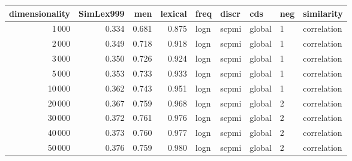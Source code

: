 \begin{tabular}{rrrrlllll}
\toprule
 dimensionality &  SimLex999 &    men &  lexical &  freq &  discr &     cds & neg &   similarity \\
\midrule
           1\,000 &      0.334 &  0.681 &    0.875 &  logn &  scpmi &  global &   1 &  correlation \\
           2\,000 &      0.349 &  0.718 &    0.918 &  logn &  scpmi &  global &   1 &  correlation \\
           3\,000 &      0.350 &  0.726 &    0.924 &  logn &  scpmi &  global &   1 &  correlation \\
           5\,000 &      0.353 &  0.733 &    0.933 &  logn &  scpmi &  global &   1 &  correlation \\
          10\,000 &      0.362 &  0.743 &    0.951 &  logn &  scpmi &  global &   1 &  correlation \\
          20\,000 &      0.367 &  0.759 &    0.968 &  logn &  scpmi &  global &   2 &  correlation \\
          30\,000 &      0.372 &  0.761 &    0.976 &  logn &  scpmi &  global &   2 &  correlation \\
          40\,000 &      0.373 &  0.760 &    0.977 &  logn &  scpmi &  global &   2 &  correlation \\
          50\,000 &      0.376 &  0.759 &    0.980 &  logn &  scpmi &  global &   2 &  correlation \\
\bottomrule
\end{tabular}

